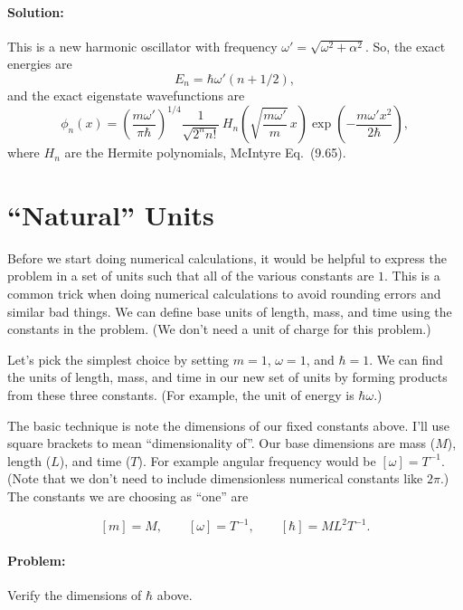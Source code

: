 \documentclass[fontsize=11pt,paper=letter,twoside=false,onecolumn]{article} %
\begin{document}
\paragraph*{Solution:}
This is a new harmonic oscillator with frequency $\omega' = \sqrt{\omega^2+\alpha^2}$.
So, the exact energies are
\begin{equation}\label{eq:exact_energies}
    E_n = \hbar\omega'(n+1/2),    
\end{equation}
and the exact eigenstate wavefunctions are
\begin{equation}\label{eq:exact_states}
    \phi_n(x)= \left(\frac{m\omega'}{\pi\hbar} \right)^{1/4}
    \frac{1}{\sqrt{2^nn!}}\, H_n\left(\sqrt{\frac{m\omega'}{m}}\,x \right)\exp\left(-\frac{m\omega'x^2}{2\hbar}\right),
\end{equation}
where $H_n$ are the Hermite polynomials, McIntyre Eq.~(9.65).

\section{``Natural'' Units}
Before we start doing numerical calculations, it would be helpful to express the problem in a set of units such that all of the various constants are $1$.  
This is a common trick when doing numerical calculations to avoid rounding errors and similar bad things.
We can define base units of length, mass, and time using the constants in the problem.
(We don't need a unit of charge for this problem.)

Let's pick the simplest choice by setting $m=1$, $\omega=1$, and $\hbar=1$.  We can find the units of length, mass, and time in our new set of units by forming products from these three constants.  (For example, the unit of energy is $\hbar\omega$.)

The basic technique is note the dimensions of our fixed constants above.
I'll use square brackets to mean ``dimensionality of''.
Our base dimensions are mass ($M$), length ($L$), and time ($T$).
For example angular frequency would be $[\omega]=T^{-1}$. (Note that we don't need to include dimensionless numerical constants like $2\pi$.)
The constants we are choosing as ``one'' are

\[
    [m] = M,\qquad [\omega]=T^{-1}, \qquad [\hbar]=M L^2 T^{-1}.    
\]

\paragraph*{Problem: }Verify the dimensions of $\hbar$ above.
\end{document}
